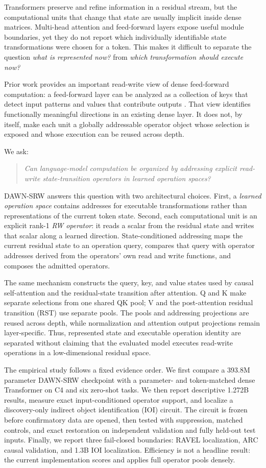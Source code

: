 \documentclass{article}
\newcommand{\DAWN}{DAWN-SRW}
\begin{document}
Transformers preserve and refine information in a residual stream, but the
computational units that change that state are usually implicit inside dense
matrices. Multi-head attention and feed-forward layers expose useful module
boundaries, yet they do not report which individually identifiable state
transformations were chosen for a token. This makes it difficult to separate
the question \emph{what is represented now?} from \emph{which transformation
should execute now?}

Prior work provides an important read-write view of dense feed-forward
computation: a feed-forward layer can be analyzed as a collection of keys that
detect input patterns and values that contribute outputs
\cite{geva2021transformer}. That view identifies functionally meaningful
directions in an existing dense layer. It does not, by itself, make each unit a
globally addressable operator object whose selection is exposed and whose
execution can be reused across depth.

We ask:
\begin{quote}
\emph{Can language-model computation be organized by addressing explicit
read-write state-transition operators in learned operation spaces?}
\end{quote}
\DAWN{} answers this question with two architectural choices. First, a
\emph{learned operation space} contains addresses for executable
transformations rather than representations of the current token state.
Second, each computational unit is an explicit rank-1 \emph{RW operator}: it
reads a scalar from the residual state and writes that scalar along a learned
direction. State-conditioned addressing maps the current residual state to an
operation query, compares that query with operator addresses derived from the
operators' own read and write functions, and composes the admitted operators.

The same mechanism constructs the query, key, and value states used by causal
self-attention and the residual-state transition after attention. Q and K make
separate selections from one shared QK pool; V and the post-attention residual
transition (RST) use separate pools. The pools and addressing projections are
reused across depth, while normalization and attention output projections
remain layer-specific. Thus, represented state and executable operation
identity are separated without claiming that the evaluated model executes
read-write operations in a low-dimensional residual space.

The empirical study follows a fixed evidence order. We first compare a 393.8M
parameter \DAWN{} checkpoint with a parameter- and token-matched dense
Transformer on C4 and six zero-shot tasks. We then report descriptive 1.272B
results, measure exact input-conditioned operator support, and localize a
discovery-only indirect object identification (IOI) circuit. The circuit is
frozen before confirmatory data are opened, then tested with suppression,
matched controls, and exact restoration on independent validation and fully
held-out test inputs. Finally, we report three fail-closed boundaries: RAVEL
localization, ARC causal validation, and 1.3B IOI localization. Efficiency is
not a headline result: the current implementation scores and applies full
operator pools densely.
\end{document}
